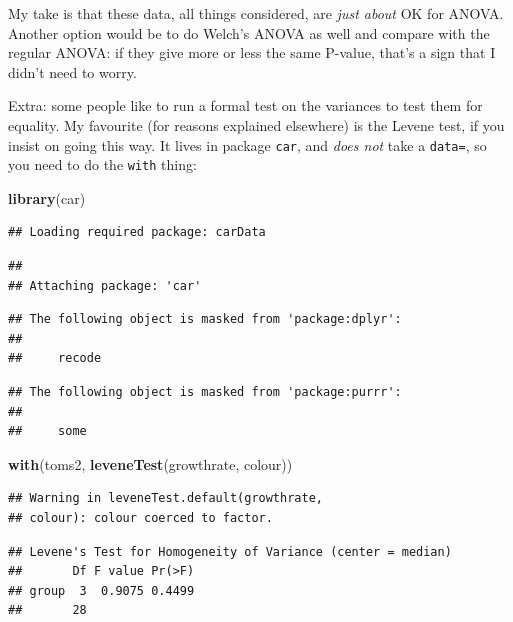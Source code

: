 \documentclass[]{tufte-book}
\newenvironment{Shaded}{}{}
\newcommand{\KeywordTok}[1]{\textcolor[rgb]{0.00,0.44,0.13}{\textbf{#1}}}
\newcommand{\NormalTok}[1]{#1}
\theoremstyle{definition}
\theoremstyle{definition}
\theoremstyle{definition}
\theoremstyle{remark}
\begin{document}
My take is that these data, all things considered, are \emph{just
about} OK for ANOVA. Another option would be to do Welch's ANOVA as well
and compare with the regular ANOVA: if they give more or less the same
P-value, that's a sign that I didn't need to worry.

Extra: some people like to run a formal test on the variances to test
them for equality. My favourite (for reasons explained elsewhere) is the
Levene test, if you insist on going this way. It lives in package
\texttt{car}, and \emph{does not} take a \texttt{data=}, so you need to
do the \texttt{with} thing:

\begin{Shaded}
\begin{Highlighting}[]
\KeywordTok{library}\NormalTok{(car)}
\end{Highlighting}
\end{Shaded}

\begin{verbatim}
## Loading required package: carData
\end{verbatim}

\begin{verbatim}
## 
## Attaching package: 'car'
\end{verbatim}

\begin{verbatim}
## The following object is masked from 'package:dplyr':
## 
##     recode
\end{verbatim}

\begin{verbatim}
## The following object is masked from 'package:purrr':
## 
##     some
\end{verbatim}

\begin{Shaded}
\begin{Highlighting}[]
\KeywordTok{with}\NormalTok{(toms2, }\KeywordTok{leveneTest}\NormalTok{(growthrate, colour))}
\end{Highlighting}
\end{Shaded}

\begin{verbatim}
## Warning in leveneTest.default(growthrate,
## colour): colour coerced to factor.
\end{verbatim}

\begin{verbatim}
## Levene's Test for Homogeneity of Variance (center = median)
##       Df F value Pr(>F)
## group  3  0.9075 0.4499
##       28
\end{verbatim}
\end{document}

